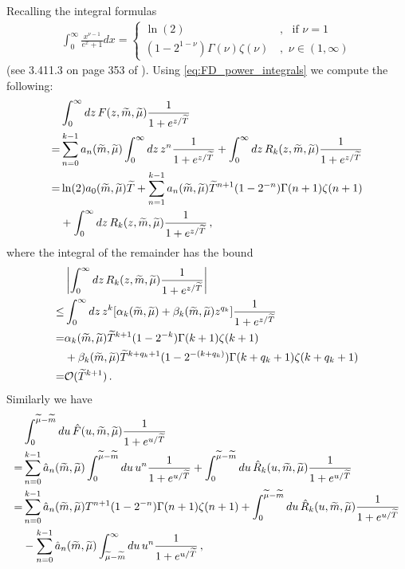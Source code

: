 \documentclass[sn-mathphys,Numbered]{sn-jnl}
\newcommand{\wt}[1]{\widetilde{#1}}
\begin{document}
Recalling the integral formulas
\begin{align}\label{eq:FD_power_integrals}
    \int_0^\infty \frac{x^{\nu-1}}{e^{ x}+1}dx=\begin{cases}
    \ln(2) &\,, \,\,\text{ if }\nu=1\\
        (1-2^{1-\nu})\Gamma(\nu)\zeta(\nu)  &\,, \,\,\nu\in(1,\infty)
    \end{cases}
\end{align}
(see 3.411.3 on page 353 of  \cite{Gradshteyn:1943cpj}). Using \eqref{eq:FD_power_integrals} we compute the following:
\begin{align}
 &\int_0^\infty dz\, F(z,\wt{m},\wt{\mu})\frac{1}{1+e^{z/\wt{T}}}\\
 =& \sum_{n=0}^{k-1} a_{n}(\wt{m},\wt{\mu})\int_0^\infty dz\, z^n \frac{1}{1+e^{z/\wt{T}}}+ \int_0^\infty dz\, R_k(z,\wt{m},\wt{\mu})\frac{1}{1+e^{z/\wt{T}}}\notag\\
 =&\ln(2)a_0(\widetilde{m},\widetilde{\mu})\widetilde{T} +\sum_{n=1}^{k-1} a_{n}(\wt{m},\wt{\mu})\wt{T}^{n+1}(1-2^{-n})\Gamma(n+1)\zeta(n+1)\notag\\
 &+ \int_0^\infty dz\, R_k(z,\wt{m},\wt{\mu})\frac{1}{1+e^{z/\wt{T}}}\,,\notag
\end{align}
where the integral of the remainder has the bound
\begin{align}
  &\left|\int_0^\infty dz\, R_k(z,\wt{m},\wt{\mu})\frac{1}{1+e^{z/\wt{T}}}\right|\\
  \leq &   \int_0^\infty dz\,z^k[\alpha_k(\wt{m},\wt{\mu})+\beta_k(\wt{m},\wt{\mu}) z^{q_k}]\frac{1}{1+e^{z/\wt{T}}}\notag\\
  =& \alpha_k(\wt{m},\wt{\mu}) \wt{T}^{k+1}(1-2^{-k})\Gamma(k+1)\zeta(k+1)\notag\\
  &+\beta_k(\wt{m},\wt{\mu}) \wt{T}^{k+q_k+1}(1-2^{-(k+q_k)})\Gamma(k+q_k+1)\zeta(k+q_k+1)\notag\\ 
  =&\mathcal{O}(\wt{T}^{k+1})\,.\notag
\end{align}
Similarly we have
\begin{align}
    &\int_0^{\wt{\mu}-\wt{m}} du\,\hat{F}(u,\wt{m},\wt{\mu})\frac{1}{1+e^{u/\wt{T}}}\\
    =&\sum_{n=0}^{k-1} \hat{a}_{n}(\wt{m},\wt{\mu})\int_0^{\wt{\mu}-\wt{m}} du \,u^n  \frac{1}{1+e^{u/\wt{T}}}+ \int_0^{\wt{\mu}-\wt{m}} du\,\hat{R}_k(u,\wt{m},\wt{\mu}) \frac{1}{1+e^{u/\wt{T}}}    \notag\\
        =&\sum_{n=0}^{k-1} \hat{a}_{n}(\wt{m},\wt{\mu})
        T^{n+1}(1-2^{-n})\Gamma(n+1)\zeta(n+1)      
        + \int_0^{\wt{\mu}-\wt{m}} du\,\hat{R}_k(u,\wt{m},\wt{\mu}) \frac{1}{1+e^{u/\wt{T}}}    \notag\\
        &-\sum_{n=0}^{k-1} \hat{a}_{n}(\wt{m},\wt{\mu})\int_{\wt{\mu}-\wt{m}}^\infty du\, u^n  \frac{1}{1+e^{u/\wt{T}}}\,,\notag
\end{align}
\end{document}
